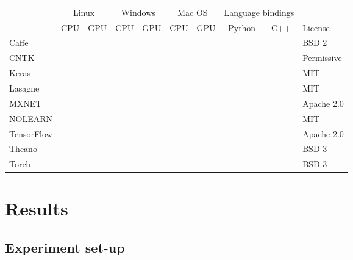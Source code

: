 \documentclass[a4paper, 11pt, table]{article}
\newcommand{\cmark}{\ding{51}}%
\newcommand{\xmark}{\ding{55}}%
\newcommand{\ymark}{\textcolor{clyes}{\cmark}}%
\newcommand{\nmark}{\textcolor{clno}{\xmark}}%
\begin{document}
\begin{landscape}
\begin{center}
\label{tbl:comparison_of_dl_lib}
\begin{tabular}{lccccccccl}
\hline 
 & \multicolumn{2}{c}{\cellcolor{linux}Linux} & \multicolumn{2}{c}{\cellcolor{windows}Windows} & \multicolumn{2}{c}{\cellcolor{macos}Mac OS} & \multicolumn{2}{c}{Language bindings} &  \\ 
 & \cellcolor{linux}CPU & \cellcolor{linux}GPU & \cellcolor{windows}CPU & \cellcolor{windows}GPU & \cellcolor{macos}CPU & \cellcolor{macos}GPU & Python & C++ & License\\ 
\hline 
Caffe & \ymark & \ymark & \ymark & \ymark & \ymark & \ymark & \ymark & \nmark & BSD 2\\ 
CNTK & \ymark & \ymark & \ymark & \ymark & \nmark & \nmark & \ymark & \ymark & Permissive \\ 
Keras & \ymark & \ymark & \ymark & \ymark & \ymark & \ymark & \ymark & \nmark & MIT \\ 
Lasagne & \ymark & \ymark & \ymark & \ymark & \ymark & \ymark & \ymark & \nmark & MIT \\ 
MXNET & \ymark & \ymark & \ymark & \ymark & \ymark & \ymark & \ymark & \ymark & Apache 2.0 \\ 
NOLEARN & \ymark & \ymark & \ymark & \ymark & \ymark & \ymark & \ymark & \nmark & MIT \\ 
TensorFlow & \ymark & \ymark & \nmark & \nmark & \ymark & \nmark & \ymark & \ymark & Apache 2.0 \\ 
Theano & \ymark & \ymark & \ymark & \ymark & \ymark & \ymark & \ymark & \nmark & BSD 3\\ 
Torch & \ymark & \ymark & \ymark & \ymark & \ymark & \ymark & \nmark & \ymark & BSD 3\\ 
\end{tabular} 
\end{center}


\end{landscape}

\section{Results}

\subsection{Experiment set-up}
\end{document}
